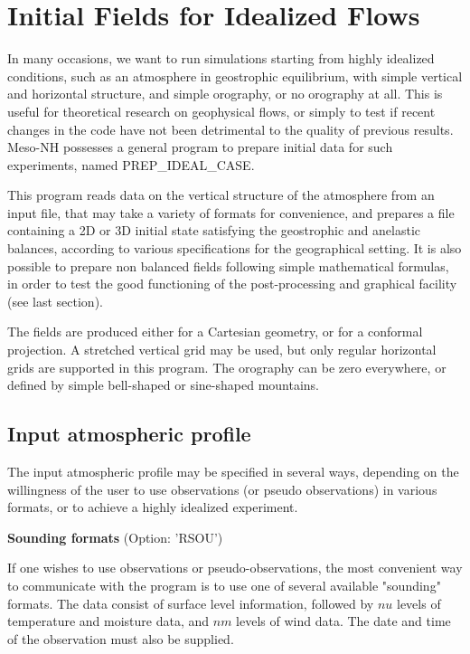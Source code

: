 \chapter{Initial Fields for Idealized Flows}
\minitoc


In many occasions, we want to run simulations starting from highly idealized
conditions, such as an atmosphere in geostrophic equilibrium, with simple
vertical and horizontal structure, and simple orography, or no orography
at all.  This is useful
for theoretical research on geophysical flows, or simply to test if recent
changes in the code have not been detrimental to the quality of previous
results.  Meso-NH possesses a general program to prepare initial data for
such experiments, named PREP\_IDEAL\_CASE.

This program reads data on the
vertical structure of the atmosphere from an input file, that may take a
variety of formats for convenience, and prepares a file containing a 2D or 3D
initial state satisfying the geostrophic and anelastic balances,
according to various specifications for the geographical setting.
It is also possible to prepare non balanced fields following simple mathematical
formulas, in order to test the good functioning of the post-processing
and graphical facility (see last section).

The fields are produced either for a Cartesian geometry, or for a conformal
projection.  A stretched vertical grid may be used, but only regular horizontal
grids are supported in this program. The orography can be zero everywhere,
or defined by simple bell-shaped or sine-shaped mountains.

\section{Input atmospheric profile}
The input atmospheric profile may be specified in several ways, depending
on the willingness of the user to use observations (or pseudo observations)
in various formats, or to achieve a highly idealized experiment.

{\bf Sounding formats } (Option: 'RSOU')

If one wishes to use observations or pseudo-observations, the most convenient
way to communicate with the program is to use one of several available
"sounding" formats. The data consist of surface level information, followed
by $nu$ levels of temperature and moisture data, and $nm$ levels of wind data.
The date and time of the observation must also be supplied.

